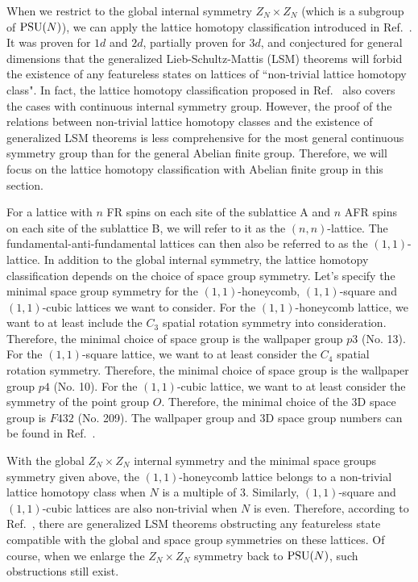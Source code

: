 \documentclass[aps,prb,twocolumn,superscriptaddress,showpacs]{revtex4}
\def\PSU{{\rm PSU}}
\begin{document}
When we restrict to the global internal symmetry $Z_N \times Z_N$
(which is a subgroup of $\PSU(N)$), we can apply the lattice
homotopy classification introduced in Ref.~. It
was proven for $1d$ and $2d$, partially proven for $3d$, and
conjectured for general dimensions that the generalized
Lieb-Schultz-Mattis (LSM) theorems will forbid the existence of
any featureless states on lattices of ``non-trivial lattice
homotopy class". In fact, the lattice homotopy classification
proposed in Ref.~ also covers the cases with
continuous internal symmetry group. However, the proof of the
relations between non-trivial lattice homotopy classes and the
existence of generalized LSM theorems is less comprehensive for
the most general continuous symmetry group than for the general
Abelian finite group. Therefore, we will focus on the lattice
homotopy classification with Abelian finite group in this section.

For a lattice with $n$ FR spins on each site of the sublattice A
and $n$ AFR spins on each site of the sublattice B, we will refer
to it as the $(n,n)$-lattice. The fundamental-anti-fundamental
lattices can then also be referred to as the $(1,1)$-lattice. In
addition to the global internal symmetry, the lattice homotopy
classification depends on the choice of space group symmetry.
Let's specify the minimal space group symmetry for the
$(1,1)$-honeycomb, $(1,1)$-square and $(1,1)$-cubic lattices we
want to consider. For the $(1,1)$-honeycomb lattice, we want to at
least include the $C_3$ spatial rotation symmetry into
consideration. Therefore, the minimal choice of space group is the
wallpaper group $p3$ (No. 13). For the $(1,1)$-square lattice, we
want to at least consider the $C_4$ spatial rotation symmetry.
Therefore, the minimal choice of space group is the wallpaper
group $p4$ (No. 10). For the $(1, 1)$-cubic lattice, we want to at
least consider the symmetry of the point group $O$. Therefore, the
minimal choice of the 3D space group is $F432$ (No. 209). The
wallpaper group and 3D space group numbers can be found in
Ref.~.

With the global $Z_N \times Z_N$ internal symmetry and the minimal
space groups symmetry given above, the $(1,1)$-honeycomb lattice
belongs to a non-trivial lattice homotopy class when $N$ is a
multiple of 3. Similarly, $(1,1)$-square and $(1,1)$-cubic
lattices are also non-trivial when $N$ is even. Therefore,
according to Ref.~, there are generalized LSM
theorems obstructing any featureless state compatible with the
global and space group symmetries on these lattices. Of course,
when we enlarge the $Z_N \times Z_N$ symmetry back to $\PSU(N)$,
such obstructions still exist.
\end{document}
